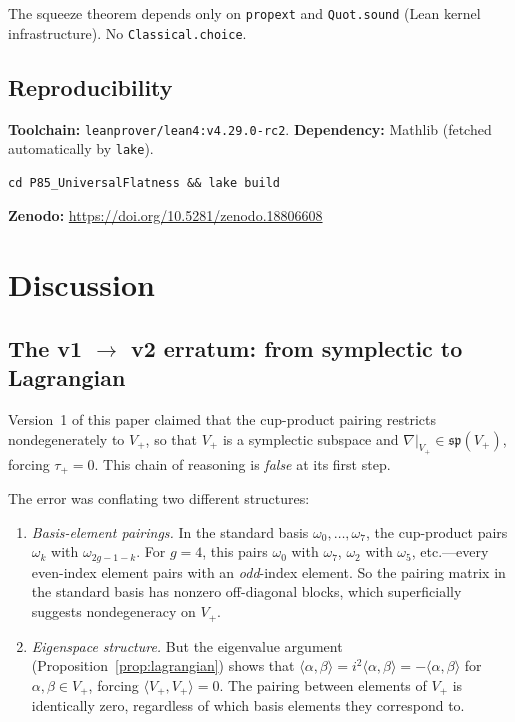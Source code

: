\documentclass[11pt]{article}
\theoremstyle{plain}
\theoremstyle{definition}
\theoremstyle{remark}
\begin{document}
The squeeze theorem depends only on \texttt{propext} and
\texttt{Quot.sound} (Lean kernel infrastructure).  No
\texttt{Classical.choice}.

\subsection{Reproducibility}

\textbf{Toolchain:} \texttt{leanprover/lean4:v4.29.0-rc2}.
\textbf{Dependency:} Mathlib (fetched automatically by \texttt{lake}).

\begin{verbatim}
cd P85_UniversalFlatness && lake build
\end{verbatim}

\noindent
\textbf{Zenodo:} \url{https://doi.org/10.5281/zenodo.18806608}

\section{Discussion}\label{sec:discussion}

\subsection{The v1 $\to$ v2 erratum: from symplectic to Lagrangian}

Version~1 of this paper claimed that the cup-product pairing restricts
nondegenerately to $V_+$, so that $V_+$ is a symplectic subspace and
$\nabla|_{V_+} \in \mathfrak{sp}(V_+)$, forcing $\tau_+ = 0$.  This
chain of reasoning is \emph{false} at its first step.

The error was conflating two different structures:
\begin{enumerate}[nosep]
\item \emph{Basis-element pairings.}  In the standard basis
  $\omega_0, \ldots, \omega_7$, the cup-product pairs $\omega_k$
  with $\omega_{2g-1-k}$.  For $g = 4$, this pairs $\omega_0$ with
  $\omega_7$, $\omega_2$ with $\omega_5$, etc.---every even-index
  element pairs with an \emph{odd}-index element.  So the pairing
  matrix in the standard basis has nonzero off-diagonal blocks, which
  superficially suggests nondegeneracy on $V_+$.
\item \emph{Eigenspace structure.}  But the eigenvalue argument
  (Proposition~\ref{prop:lagrangian}) shows that $\langle \alpha,
  \beta \rangle = i^2 \langle \alpha, \beta \rangle = -\langle \alpha,
  \beta \rangle$ for $\alpha, \beta \in V_+$, forcing
  $\langle V_+, V_+ \rangle = 0$.  The pairing between elements
  of $V_+$ is identically zero, regardless of which basis elements
  they correspond to.
\end{enumerate}
\end{document}
